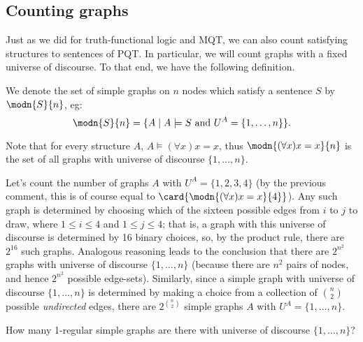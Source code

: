 \subsection*{Counting graphs}

Just as we did for truth-functional logic and MQT, we can also count satisfying structures to sentences of PQT. In particular, we will count graphs with a fixed universe of discourse. To that end, we have the following definition. 

\begin{definition}
We denote the set of simple graphs on $n$ nodes which satisfy a sentence $S$ by $\modn{S}{n}$, eg: \[\modn{S}{n}=\{A\mid A\models S\mbox{ and }U^A=\{1,\ldots,n\}\}.\] 
\end{definition}

Note that for every structure $A$, $A\models (\forall x)x=x$, thus  $\modn{(\forall x)x=x}{n}$ is the set of all graphs with universe of discourse $\{1,\ldots,n\}$. 

Let's count the number of graphs $A$ with $U^A=\{1,2,3,4\}$ (by the previous comment, this is of course equal to $\card{\modn{(\forall x)x=x}{4}}$). Any such graph is determined by choosing which of the sixteen possible edges from $i$ to $j$ to draw, where $1\leq i\leq 4$ and $1\leq j\leq 4$; that is, a graph with this universe of discourse is determined by 16 binary choices, so, by the product rule, there are $2^{16}$ such graphs. Analogous reasoning leads to the conclusion that there are $2^{n^2}$ graphs with universe of discourse $\{1,\ldots, n\}$ (because there are $n^2$ pairs of nodes, and hence $2^{n^2}$ possible edge-sets). Similarly, since a simple graph with universe of discourse $\{1,\ldots, n\}$ is determined by making a choice from a collection of $\binom{n}{2}$ possible \emph{undirected} edges, there are $2^{\binom{n}{2}}$ simple graphs $A$ with $U^A=\{1,\ldots, n\}$. 

\begin{aside}
    How many 1-regular simple graphs are there with universe of discourse $\{1,\ldots, n\}$? 
\end{aside}

